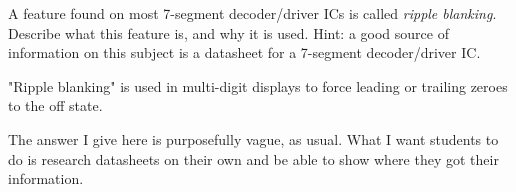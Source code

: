 

A feature found on most 7-segment decoder/driver ICs is called {\it ripple blanking}.  Describe what this feature is, and why it is used.  Hint: a good source of information on this subject is a datasheet for a 7-segment decoder/driver IC.







"Ripple blanking" is used in multi-digit displays to force leading or trailing zeroes to the off state.







The answer I give here is purposefully vague, as usual.  What I want students to do is research datasheets on their own and be able to show where they got their information.




